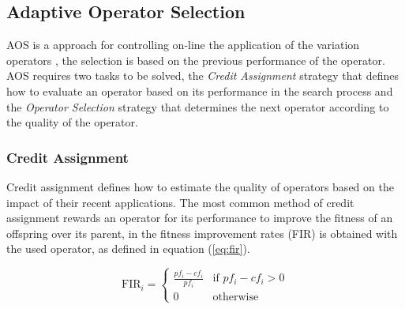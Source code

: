 \documentclass[journal]{IEEEtran}
\begin{document}
\subsection{Adaptive Operator Selection}
AOS is a approach for controlling on-line the application of the variation operators \cite{hitomi2016classification}, the selection is based on the previous performance of the operator.
AOS requires two tasks to be solved, the \textit{Credit Assignment} strategy that defines how to evaluate an operator based on its performance in the search process and the \textit{Operator Selection} strategy that determines the next operator according to the quality of the operator.

\subsubsection{Credit Assignment}
Credit assignment defines how to estimate the quality of operators based on the impact of their recent applications.
The most common method of credit assignment rewards an operator for its performance to improve the fitness of an offspring over its parent, in \cite{lin2016adaptive} the fitness improvement rates (FIR) is obtained with the used operator, as defined in equation (\ref{eq:fir}).

\begin{equation}
  \text{FIR}_{i}=\left\{
  \begin{array}{ll}
    \frac{pf_{i}-cf_{i}}{pf_{i}} & \text{if }pf_{i}-cf_{i}>0 \\

    0                            & \text{otherwise}
  \end{array}
  \right.
  \label{eq:fir}
\end{equation}
\end{document}
